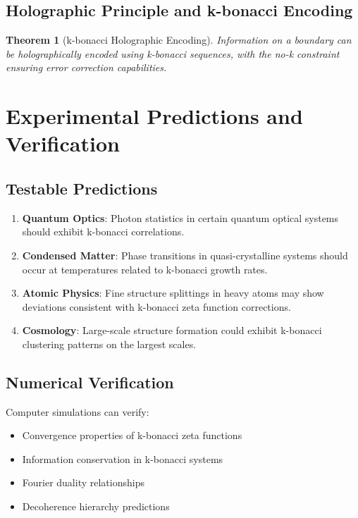 \documentclass[12pt]{article}
\theoremstyle{plain}
\newtheorem{theorem}{Theorem}[section]
\theoremstyle{definition}
\begin{document}
\subsection{Holographic Principle and k-bonacci Encoding}

\begin{theorem}[k-bonacci Holographic Encoding]
Information on a boundary can be holographically encoded using k-bonacci sequences, with the no-k constraint ensuring error correction capabilities.
\end{theorem}

\section{Experimental Predictions and Verification}

\subsection{Testable Predictions}

\begin{enumerate}
\item \textbf{Quantum Optics}: Photon statistics in certain quantum optical systems should exhibit k-bonacci correlations.

\item \textbf{Condensed Matter}: Phase transitions in quasi-crystalline systems should occur at temperatures related to k-bonacci growth rates.

\item \textbf{Atomic Physics}: Fine structure splittings in heavy atoms may show deviations consistent with k-bonacci zeta function corrections.

\item \textbf{Cosmology}: Large-scale structure formation could exhibit k-bonacci clustering patterns on the largest scales.
\end{enumerate}

\subsection{Numerical Verification}

Computer simulations can verify:
\begin{itemize}
\item Convergence properties of k-bonacci zeta functions
\item Information conservation in k-bonacci systems
\item Fourier duality relationships
\item Decoherence hierarchy predictions
\end{itemize}
\end{document}
